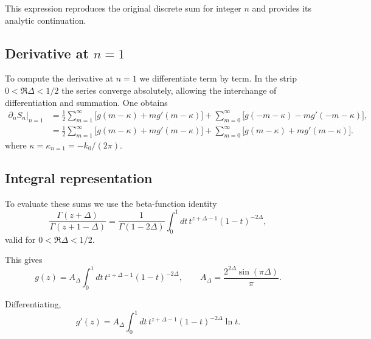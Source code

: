\documentclass[11pt]{article}
\newcommand{\p}{\partial}
\newcommand{\nn}{\nonumber}
\begin{document}
This expression reproduces the original discrete sum for integer $n$ and
provides its analytic continuation.

\subsection{\texorpdfstring{Derivative at $n=1$}{Derivative at n=1}}

To compute the derivative at $n=1$ we differentiate term by term.  In the
strip $0<\Re\Delta<1/2$ the series converge absolutely, allowing the
interchange of differentiation and summation.  One obtains
\begin{align}
\partial_n S_n\big|_{n=1}&=\frac{1}{2}
\sum_{m=1}^\infty\big[g(m-\kappa)+m g'(m-\kappa)\big]
+
\sum_{m=0}^\infty\big[g(-m-\kappa)-m g'(-m-\kappa)\big],  \nn \\
&= \frac{1}{2}
\sum_{m=1}^\infty\big[g(m-\kappa)+m g'(m-\kappa)\big] + \sum_{m=0}^\infty\big[g(m-\kappa)+m g'(m-\kappa)\big].
\end{align}
where $\kappa=\kappa_{n=1}=-k_0/(2\pi)$.

\subsection{Integral representation}

To evaluate these sums we use the beta-function identity
\begin{equation}
\frac{\Gamma(z+\Delta)}{\Gamma(z+1-\Delta)}
=
\frac{1}{\Gamma(1-2\Delta)}
\int_0^1 dt\, t^{z+\Delta-1}(1-t)^{-2\Delta},
\end{equation}
valid for $0<\Re\Delta<1/2$.

This gives
\begin{equation}
g(z)=A_\Delta\int_0^1 dt\, t^{z+\Delta-1}(1-t)^{-2\Delta},
\qquad
A_\Delta=\frac{2^{2\Delta}\sin(\pi\Delta)}{\pi}.
\end{equation}

Differentiating,
\begin{equation}
g'(z)=A_\Delta\int_0^1 dt\, t^{z+\Delta-1}(1-t)^{-2\Delta}\ln t .
\end{equation}
\end{document}
